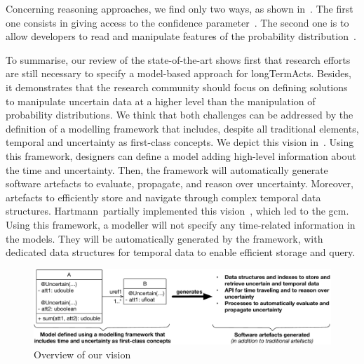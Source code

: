 Concerning reasoning approaches, we find only two ways, as shown in~.
The first one consists in giving access to the confidence parameter~\cite{DBLP:conf/models/BurguenoBMV18, DBLP:conf/ecmdafa/BertoaMBBTV18, DBLP:conf/sle/MayerhoferWV16, DBLP:conf/quatic/VallecilloMO16, DBLP:journals/tkde/BarbaraGP92, DBLP:conf/uist/SchwarzMH11}.
The second one is to allow developers to read and manipulate features of the probability distribution~\cite{baudin2017openturns, DBLP:conf/asplos/BornholtMM14, DBLP:journals/corr/BorgstromGGMG13, osti_1430202, DBLP:journals/peerj-cs/SalvatierWF16, DBLP:conf/popl/BhatAVG12, DBLP:conf/aistats/ChagantyNR13, DBLP:journals/siamsc/JaroszewiczK12, DBLP:journals/toplas/ParkPT08, DBLP:conf/ijcai/Pfeffer01, DBLP:conf/popl/RamseyP02, DBLP:conf/pldi/SankaranarayananCG13, DBLP:conf/icra/Thrun00, DBLP:journals/sac/LunnTBS00, plummer2003jags}.

To summarise, our review of the state-of-the-art shows first that research efforts are still necessary to specify a model-based approach for \glspl{longTermAct}.
Besides, it demonstrates that the research community should focus on defining solutions to manipulate uncertain data at a higher level than the manipulation of probability distributions.
We think that both challenges can be addressed by the definition of a modelling framework that includes, despite all traditional elements, temporal and uncertainty as first-class concepts.
We depict this vision in~.
Using this framework, designers can define a model adding high-level information about the time and uncertainty.
Then, the framework will automatically generate software artefacts to evaluate, propagate, and reason over uncertainty.
Moreover, artefacts to efficiently store and navigate through complex temporal data structures.
Hartmann~\etal partially implemented this vision~\cite{DBLP:journals/is/HartmannFMRT19}, which led to the \gls{gcm}. 
Using this framework, a modeller will not specify any time-related information in the models.
They will be automatically generated by the framework, with dedicated data structures for temporal data to enable efficient storage and query.

\begin{figure}
	\centering
	\includegraphics[width=\linewidth]{img/chapt-vision/vision}
	\caption{Overview of our vision}
	\label{fig:vision:vision}
\end{figure}

